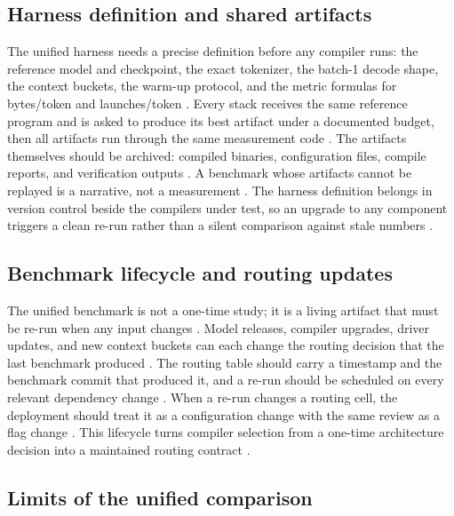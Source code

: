 \subsection{Harness definition and shared artifacts}

The unified harness needs a precise definition before any compiler runs: the reference model and checkpoint, the exact tokenizer, the batch-1 decode shape, the context buckets, the warm-up protocol, and the metric formulas for bytes/token and launches/token \citep{patel2025llminference,taxbreak2026,memoryfloor2026}. Every stack receives the same reference program and is asked to produce its best artifact under a documented budget, then all artifacts run through the same measurement code \citep{chen2020compilerbasedhardw,patel2025llminference}. The artifacts themselves should be archived: compiled binaries, configuration files, compile reports, and verification outputs \citep{memoryfloor2026,taxbreak2026}. A benchmark whose artifacts cannot be replayed is a narrative, not a measurement \citep{patel2025llminference,memoryfloor2026}. The harness definition belongs in version control beside the compilers under test, so an upgrade to any component triggers a clean re-run rather than a silent comparison against stale numbers \citep{chen2020compilerbasedhardw,taxbreak2026}.

\subsection{Benchmark lifecycle and routing updates}

The unified benchmark is not a one-time study; it is a living artifact that must be re-run when any input changes \citep{memoryfloor2026,patel2025llminference}. Model releases, compiler upgrades, driver updates, and new context buckets can each change the routing decision that the last benchmark produced \citep{taxbreak2026,chen2020compilerbasedhardw}. The routing table should carry a timestamp and the benchmark commit that produced it, and a re-run should be scheduled on every relevant dependency change \citep{patel2025llminference,memoryfloor2026}. When a re-run changes a routing cell, the deployment should treat it as a configuration change with the same review as a flag change \citep{chen2020compilerbasedhardw,taxbreak2026}. This lifecycle turns compiler selection from a one-time architecture decision into a maintained routing contract \citep{patel2025llminference,memoryfloor2026}.

\subsection{Limits of the unified comparison}

